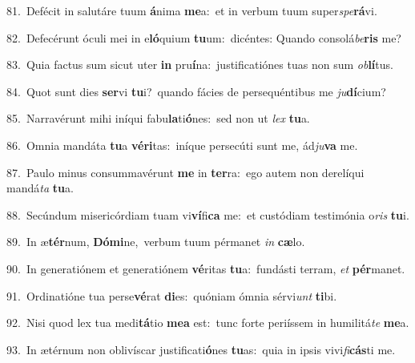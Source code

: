 {\numbfont\textcolor{\numbcolor}{81.}}~Defécit in salutáre tuum \textbf{á}\-nima \textbf{me}\-a:~\star et in verbum tuum super\-\textit{spe}\-\textbf{rá}vi.\par
{\numbfont\textcolor{\numbcolor}{82.}}~Defecérunt óculi mei in e\-\textbf{ló}\-quium \textbf{tu}\-um:~\star dicéntes: Quando consolá\-\textit{be}\-\textbf{ris} me?\par
{\numbfont\textcolor{\numbcolor}{83.}}~Quia factus sum sicut uter \textbf{in} pru\-\textbf{í}\-na:~\star justificatiónes tuas non sum \textit{ob}\-\textbf{lí}tus.\par
{\numbfont\textcolor{\numbcolor}{84.}}~Quot sunt dies \textbf{ser}\-vi \textbf{tu}\-i?~\star quando fácies de persequéntibus me \textit{ju}\-\textbf{dí}cium?\par
{\numbfont\textcolor{\numbcolor}{85.}}~Narravérunt mihi iníqui fabu\-\textbf{la}\-ti\-\textbf{ó}\-nes:~\star sed non ut \textit{lex} \textbf{tu}\-a.\par
{\numbfont\textcolor{\numbcolor}{86.}}~Omnia mandáta \textbf{tu}\-a \textbf{vé}\-\textbf{ri}tas:~\star iníque persecúti sunt me, ád\-\textit{ju}\-\textbf{va} me.\par
{\numbfont\textcolor{\numbcolor}{87.}}~Paulo minus consummavérunt \textbf{me} in \textbf{ter}\-ra:~\star ego autem non derelíqui mandá\textit{ta} \textbf{tu}\-a.\par
{\numbfont\textcolor{\numbcolor}{88.}}~Secúndum misericórdiam tuam vi\-\textbf{ví}\-fi\textbf{ca} me:~\star et custódiam testimónia o\textit{ris} \textbf{tu}\-i.\par
{\numbfont\textcolor{\numbcolor}{89.}}~In æ\-\textbf{tér}\-num, \textbf{Dó}\-\textbf{mi}ne,~\star verbum tuum pérmanet \textit{in} \textbf{cæ}\-lo.\par
{\numbfont\textcolor{\numbcolor}{90.}}~In generatiónem et generatiónem \textbf{vé}\-ritas \textbf{tu}\-a:~\star fundásti terram, \textit{et} \textbf{pér}\-manet.\par
{\numbfont\textcolor{\numbcolor}{91.}}~Ordinatióne tua perse\-\textbf{vé}\-rat \textbf{di}\-es:~\star quóniam ómnia sérvi\textit{unt} \textbf{ti}\-bi.\par
{\numbfont\textcolor{\numbcolor}{92.}}~Nisi quod lex tua medi\-\textbf{tá}\-tio \textbf{me}\-\textbf{a} est:~\star tunc forte periíssem in humilitá\textit{te} \textbf{me}\-a.\par
{\numbfont\textcolor{\numbcolor}{93.}}~In ætérnum non oblivíscar justificati\-\textbf{ó}\-nes \textbf{tu}\-as:~\star quia in ipsis vivi\-\textit{fi}\-\textbf{cás}ti me.\par
